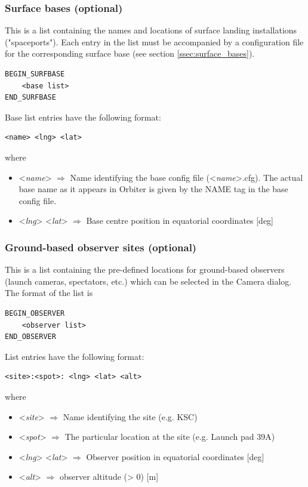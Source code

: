 \documentclass[Orbiter Developer Manual.tex]{subfiles}
\begin{document}
\subsubsection*{Surface bases (optional)}
This is a list containing the names and locations of surface landing installations ("spaceports"). Each entry in the list must be accompanied by a configuration file for the corresponding surface base (see section \ref{ssec:surface_bases}).

\begin{lstlisting}[language=OSFS]
BEGIN_SURFBASE
	<base list>
END_SURFBASE
\end{lstlisting}

\noindent
Base list entries have the following format:

\begin{lstlisting}[language=OSFS]
<name> <lng> <lat>
\end{lstlisting}

\noindent
where

\begin{itemize}
\item <\textit{name}> $\Rightarrow$ Name identifying the base config file (<\textit{name}>.cfg). The actual base name as it appears in Orbiter is given by the NAME tag in the base config file.
\item <\textit{lng}> <\textit{lat}> $\Rightarrow$ Base centre position in equatorial coordinates [deg]
\end{itemize}


\subsubsection*{Ground-based observer sites (optional)}
This is a list containing the pre-defined locations for ground-based observers (launch cameras, spectators, etc.) which can be selected in the Camera dialog. The format of the list is

\begin{lstlisting}[language=OSFS]
BEGIN_OBSERVER
	<observer list>
END_OBSERVER
\end{lstlisting}

\noindent
List entries have the following format:

\begin{lstlisting}[language=OSFS]
<site>:<spot>: <lng> <lat> <alt>
\end{lstlisting}

\noindent
where

\begin{itemize}
\item <\textit{site}> $\Rightarrow$ Name identifying the site (e.g. KSC)
\item <\textit{spot}> $\Rightarrow$ The particular location at the site (e.g. Launch pad 39A)
\item <\textit{lng}> <\textit{lat}> $\Rightarrow$ Observer position in equatorial coordinates [deg]
\item <\textit{alt}> $\Rightarrow$ observer altitude (> 0) [m]
\end{itemize}
\end{document}
